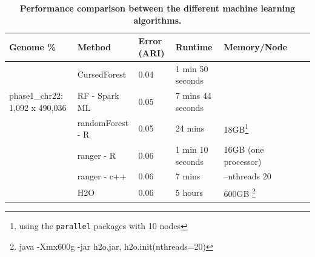 \documentclass[11pt]{article}
\newcommand{\cursedforest}{{\sc CursedForest}}
\begin{document}
\begin{table}
\begin{minipage}{\textwidth}
\centering
\caption{
{\bf Performance comparison between the different machine learning algorithms.}}
\begin{tabular}{|l|l|l|l|l|l|p{1cm}|}
\hline
\bf{Genome \%}                      & \bf{Method} & \bf{Error (ARI)} & \bf{Runtime} & \bf{Memory/Node} \\
\hline

\multirow{3}{*}{phase1\_chr22: 1,092 x 490,036} & \cursedforest & 0.04  & 1 min 50 seconds  &  \\ %
                                                & RF - Spark ML  &  0.05           &           7 mins 44 seconds        &  \\  %
                                                & randomForest - R         & 0.05       & 24 mins           & 18GB\footnote{using the \texttt{parallel} packages with 10 nodes} \\ %
                                                & ranger - R      & 0.06       & 1 min 10 seconds & 16GB  (one processor)                                             \\ %
                                                & ranger - c++     & 0.06       & 7 mins           & --nthreads 20                                                    \\  %
                                                & H2O           & 0.06       & 5 hours         & 600GB \footnote{java -Xmx600g -jar h2o.jar,   h2o.init(nthreads=20)} \\ %


\end{tabular}
\end{minipage}
\end{table}
\end{document}
